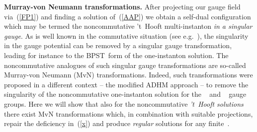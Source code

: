 \documentclass[a4paper,11pt]{article}
\numberwithin{equation}{section}
\begin{document}
{\noindent
{\bf Murray-von Neumann transformations.}
After projecting our gauge field \coordHE{} via~(\ref{FP1})
and finding a solution \coordHE{} of~(\ref{AAP}) we obtain a self-dual
configuration \coordHE{} which may be termed the noncommutative 
't~Hooft multi-instanton \coordHE{} {\it in a singular gauge\/}.
As is well known in the commutative situation 
(see e.g.~\cite{Rajaraman:1982is}), the singularity in the gauge potential 
can be removed by a singular gauge transformation, 
leading for instance to the BPST~form of the one-instanton solution.
The noncommutative analogues of such singular gauge transformations
are so-called Murray-von Neumann (MvN) transformations.
Indeed, such transformations were proposed in a different context 
-- the modified ADHM approach --
to remove the singularity of the noncommutative one-instanton solution for 
the \coordHE{}~\cite{Ho:2000ea} and \coordHE{}~\cite{Furuuchi:2001vx} gauge groups.
Here we will show that also for the noncommutative {\it 't~Hooft solutions\/} 
there exist MvN transformations which, in combination with suitable 
projections, repair the deficiency in~(\ref{x}) 
and produce {\it regular\/} solutions for any finite~\coordHE{}. 

}
\end{document}

